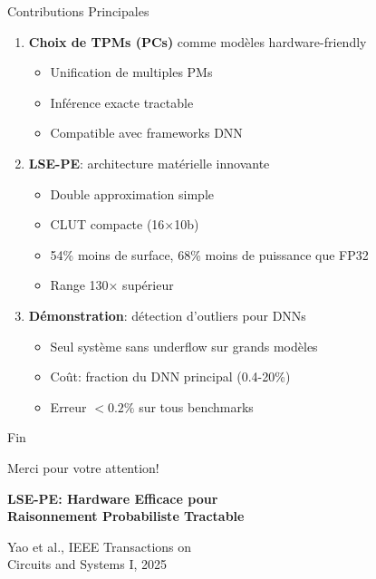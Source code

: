 \documentclass[aspectratio=169]{beamer}
\begin{document}
\begin{frame}{Contributions Principales}
\begin{enumerate}
\item \textbf{Choix de TPMs (PCs)} comme modèles hardware-friendly
   \begin{itemize}
   \item Unification de multiples PMs
   \item Inférence exacte tractable
   \item Compatible avec frameworks DNN
   \end{itemize}

\item \textbf{LSE-PE}: architecture matérielle innovante
   \begin{itemize}
   \item Double approximation simple
   \item CLUT compacte (16×10b)
   \item 54\% moins de surface, 68\% moins de puissance que FP32
   \item Range 130× supérieur
   \end{itemize}

\item \textbf{Démonstration}: détection d'outliers pour DNNs
   \begin{itemize}
   \item Seul système sans underflow sur grands modèles
   \item Coût: fraction du DNN principal (0.4-20\%)
   \item Erreur $< 0.2\%$ sur tous benchmarks
   \end{itemize}
\end{enumerate}
\end{frame}

\begin{frame}{Fin}
\begin{center}
\Huge Merci pour votre attention!

\vspace{1cm}
\large
\textbf{LSE-PE: Hardware Efficace pour\\Raisonnement Probabiliste Tractable}

\vspace{0.5cm}
\normalsize
Yao et al., IEEE Transactions on\\
Circuits and Systems I, 2025

\vspace{1cm}
\end{center}
\end{frame}
\end{document}
